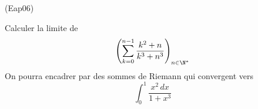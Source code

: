 \begin{tiny}(Eap06)\end{tiny}
Calculer la limite de
\begin{displaymath}
 \left( \sum_{k=0}^{n-1}\frac{k^2+n}{k^3+n^3}\right)_{n\in\N^*}
\end{displaymath}
On pourra encadrer par des sommes de Riemann qui convergent vers 
\begin{displaymath}
 \int_0^1\frac{x^2\,dx}{1+x^3}
\end{displaymath}
